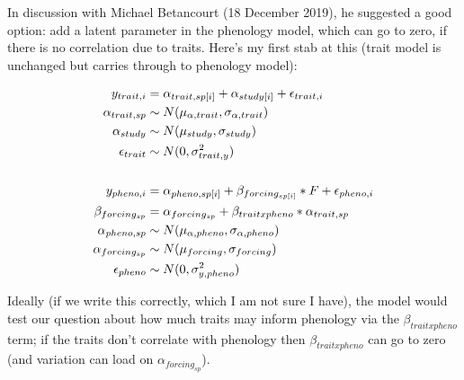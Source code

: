 \documentclass[11pt,letter]{article}
\begin{document}
In discussion with Michael Betancourt (18 December 2019), he suggested a good option: add a latent parameter in the phenology model, which can go to zero, if there is no correlation due to traits. Here's my first stab at this (trait model is unchanged but carries through to phenology model):

\begin{align*}
y_{trait, i} &= \alpha_{trait, sp[i]} + \alpha_{study[i]} + \epsilon_{trait, i}\\
\alpha_{trait, sp} & \sim N(\mu_{\alpha, trait}, \sigma_{\alpha, trait}) \\
\alpha_{study}  & \sim N(\mu_{study}, \sigma_{study})\\
\epsilon_{trait} & \sim N(0,\sigma^2_{trait, y}) \\
\vspace{1ex}\\
y_{pheno, i} &= \alpha_{pheno, sp[i]} + \beta_{forcing_{sp[i]}}*F + \epsilon_{pheno, i}\\
\beta_{forcing_{sp}} & = \alpha_{forcing_{sp}} + \beta_{trait x pheno}*\alpha_{trait, sp} \\
\alpha_{pheno, sp} & \sim N(\mu_{\alpha, pheno}, \sigma_{\alpha, pheno}) \\
\alpha_{forcing_{sp}} & \sim N(\mu_{forcing}, \sigma_{forcing})\\
\epsilon_{pheno} & \sim N(0,\sigma^2_{y, pheno}) 
\end{align*}

Ideally (if we write this correctly, which I am not sure I have), the model would test our question about how much traits may inform phenology via the $\beta_{trait x pheno}$ term; if the traits don't correlate with phenology then $\beta_{trait x pheno}$ can go to zero (and variation can load on $\alpha_{forcing_{sp}}$).
\end{document}
